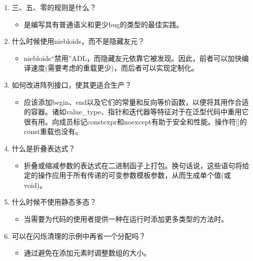 \begin{enumerate}
\item
三、五、零的规则是什么？
\begin{itemize}
\item 
是编写具有普通语义和更少bug的类型的最佳实践。
\end{itemize}

\item
什么时候使用niebloids，而不是隐藏友元？
\begin{itemize}
\item 
niebloids“禁用”ADL，而隐藏友元依靠它被发现。因此，前者可以加快编译速度(需要考虑的重载更少)，而后者可以实现定制化。
\end{itemize}

\item
如何改进阵列接口，使其更适合生产？
\begin{itemize}
\item 
应该添加begin、end以及它们的常量和反向等价函数，以便将其用作合适的容器。诸如value\_type、指针和迭代器等特征对于在泛型代码中重用它很有用。向成员标记constexpr和noexcept有助于安全和性能。操作符[]的const重载也没有。
\end{itemize}

\item
什么是折叠表达式？
\begin{itemize}
\item 
折叠或缩减参数的表达式在二进制函子上打包。换句话说，这些语句将给定的操作应用于所有传递的可变参数模板参数，从而生成单个值(或void)。
\end{itemize}

\item
什么时候不使用静态多态？
\begin{itemize}
\item 
当需要为代码的使用者提供一种在运行时添加更多类型的方法时。
\end{itemize}

\item
可以在闪烁清理的示例中再省一个分配吗？
\begin{itemize}
\item 
通过避免在添加元素时调整数组的大小。
\end{itemize}
\end{enumerate}